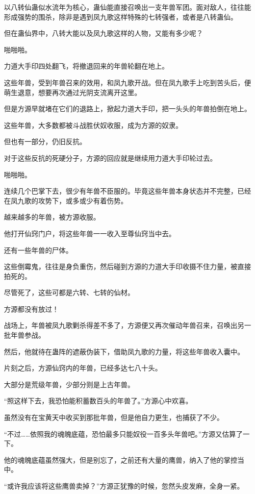 \begin{this_body}
以八转仙蛊似水流年为核心，蛊仙能直接召唤出一支年兽军团。面对敌人，往往能形成强势的围杀，除非是遇到凤九歌这样特殊的七转强者，或者是八转蛊仙。

但在蛊仙界中，八转大能以及凤九歌这样的人物，又能有多少呢？

啪啪啪。

力道大手印四处翻飞，将撤退回来的年兽轮翻在地上。

这些年兽，受到年兽召来的效用，和凤九歌开战。但在凤九歌手上吃到苦头后，便萌生退意，想要再次通过光阴支流离开这里。

但是方源早就堵在它们的退路上，掀起力道大手印，把一头头的年兽拍倒在地上。

这些年兽，大多数都被斗战胜伏奴收服，成为方源的奴隶。

但也有一部分，仍旧反抗。

对于这些反抗的死硬分子，方源的回应就是继续用力道大手印轮过去。

啪啪啪。

连续几个巴掌下去，很少有年兽不臣服的。毕竟这些年兽本身状态并不完整，已经在凤九歌的攻势下，或多或少有着伤势。

越来越多的年兽，被方源收服。

他打开仙窍门户，将这些年兽一一收入至尊仙窍当中去。

还有一些年兽的尸体。

这些倒霉鬼，往往是身负重伤，然后碰到方源的力道大手印收摄不住力量，被直接拍死的。

尽管死了，这些可都是六转、七转的仙材。

方源都没有放过！

战场上，年兽被凤九歌剿杀得差不多了，方源便又再次催动年兽召来，召唤出另一批年兽参战。

然后，他就待在蛊阵的遮蔽伪装下，借助凤九歌的力量，将这些年兽收入囊中。

片刻之后，方源仙窍内的年兽，已经多达七八十头。

大部分是荒级年兽，少部分则是上古年兽。

“照这样下去，我恐怕能积蓄数百头的年兽了。”方源心中欢喜。

虽然没有在宝黄天中收买到那批年兽，但是他自力更生，也捕获了不少。

“不过……依照我的魂魄底蕴，恐怕最多只能奴役一百多头年兽吧。”方源又估算了一下。

他的魂魄底蕴虽然强大，但是别忘了，之前还有大量的鹰兽，纳入了他的掌控当中。

“或许我应该将这些鹰兽卖掉？”方源正犹豫的时候，忽然头皮发麻，全身一紧。


\end{this_body}
